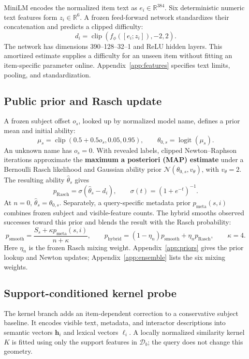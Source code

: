 \documentclass{article}
\begin{document}
MiniLM encodes the normalized item text as $e_i\in\mathbb R^{384}$. Six deterministic numeric text features form $z_i\in\mathbb R^6$. A frozen feed-forward network standardizes their concatenation and predicts a clipped difficulty:
\[
 d_i=\operatorname{clip}\!\left(f_\phi([e_i;z_i]),-2,2\right).
\]
The network has dimensions 390--128--32--1 and ReLU hidden layers. This amortized estimate supplies a difficulty for an unseen item without fitting an item-specific parameter online. Appendix~\ref{app:features} specifies text limits, pooling, and standardization.

\subsection{Public prior and Rasch update}\label{sec:rasch}

A frozen subject offset $o_s$, looked up by normalized model name, defines a prior mean and initial ability:
\[
 \mu_s=\operatorname{clip}(0.5+0.5o_s,0.05,0.95),\qquad
 \theta_{0,s}=\operatorname{logit}(\mu_s).
\]
An unknown name has $o_s=0$. With revealed labels, clipped Newton--Raphson iterations approximate the \textbf{maximum a posteriori (MAP) estimate} under a Bernoulli Rasch likelihood and Gaussian ability prior $\mathcal N(\theta_{0,s},v_\theta)$, with $v_\theta=2$. The resulting ability $\hat\theta_s$ gives
\[
 p_{\mathrm{Rasch}}=\sigma(\hat\theta_s-d_i),\qquad
 \sigma(t)=(1+e^{-t})^{-1}.
\]
At $n=0$, $\hat\theta_s=\theta_{0,s}$. Separately, a query-specific metadata prior $p_{\mathrm{meta}}(s,i)$ combines frozen subject and visible-feature counts. The hybrid smooths observed successes toward this prior and blends the result with the Rasch probability:
\[
 p_{\mathrm{smooth}}=\frac{S_s+\kappa p_{\mathrm{meta}}(s,i)}{n+\kappa},\qquad
 p_{\mathrm{hybrid}}=(1-\eta_n)p_{\mathrm{smooth}}+\eta_n p_{\mathrm{Rasch}},\qquad \kappa=4.
\]
Here $\eta_n$ is the frozen Rasch mixing weight. Appendix~\ref{app:priors} gives the prior lookup and Newton updates; Appendix~\ref{app:ensemble} lists the six mixing weights.

\subsection{Support-conditioned kernel probe}\label{sec:kernel}

The kernel branch adds an item-dependent correction to a conservative subject baseline. It encodes visible text, metadata, and interactor descriptions into semantic vectors $\mathbf h_i$ and lexical vectors $\boldsymbol\ell_i$. A locally normalized similarity kernel $K$ is fitted using only the support features in $\mathcal D_b$; the query does not change this geometry.
\end{document}
